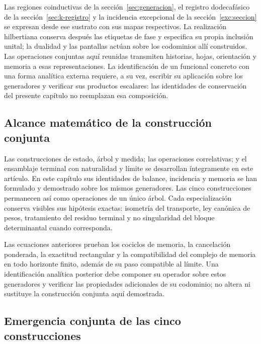 Las regiones coinductivas de la sección~\ref{sec:generacion}, el registro
dodecafásico de la sección~\ref{sec:k-registro} y la incidencia excepcional
de la sección~\ref{exc:seccion} se expresan desde ese sustrato con sus mapas
respectivos. La realización hilbertiana conserva después las etiquetas de
fase y especifica su propia inclusión unital; la dualidad y las pantallas
actúan sobre los codominios allí construidos. Las operaciones conjuntas aquí
reunidas transmiten historias, hojas, orientación y memoria a esas
representaciones. La identificación de un funcional concreto con una forma
analítica externa requiere, a su vez, escribir su aplicación sobre los
generadores y verificar sus productos escalares: las identidades de
conservación del presente capítulo no reemplazan esa composición.

\subsection{Alcance matemático de la construcción conjunta}
Las construcciones de estado, árbol y medida; las operaciones correlativas; y
el ensamblaje terminal con naturalidad y límite se desarrollan íntegramente
en este artículo. En este capítulo sus identidades de
balance, incidencia y memoria se han formulado y demostrado sobre los mismos
generadores. Las cinco construcciones permanecen así como operaciones de un
único árbol. Cada especialización conserva visibles sus hipótesis exactas:
isometría del transporte, ley canónica de pesos, tratamiento del residuo
terminal y no singularidad del bloque determinantal cuando corresponda.

Las ecuaciones anteriores prueban los cociclos de memoria, la cancelación
ponderada, la exactitud rectangular y la compatibilidad del complejo de
memoria en todo horizonte finito, además de su paso compatible al límite.
Una identificación analítica posterior debe componer su operador sobre estos
generadores y verificar las propiedades adicionales de su codominio; no
altera ni sustituye la construcción conjunta aquí demostrada.

\iffalse
\subsection{Emergencia conjunta de las cinco construcciones}
\label{sec:cinco-construcciones-continuo-ch}

